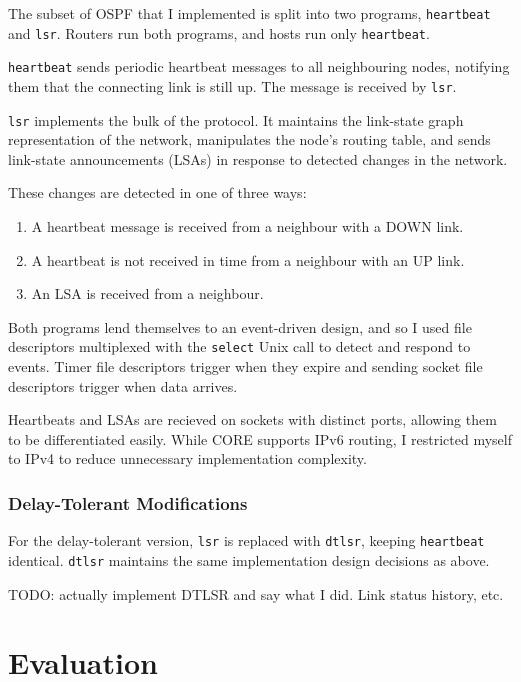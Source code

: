 \documentclass[10pt,twoside,a4paper]{article}
\begin{document}
The subset of OSPF that I implemented is split into two programs, \texttt{heartbeat} and \texttt{lsr}. Routers run both programs, and hosts run only \texttt{heartbeat}.

\texttt{heartbeat} sends periodic heartbeat messages to all neighbouring nodes, notifying them that the connecting link is still up. The message is received by \texttt{lsr}.

\texttt{lsr} implements the bulk of the protocol. It maintains the link-state graph representation of the network, manipulates the node's routing table, and sends link-state announcements (LSAs) in response to detected changes in the network.

These changes are detected in one of three ways:
\begin{enumerate}
	\item
	A heartbeat message is received from a neighbour with a DOWN link.
	
	\item
	A heartbeat is not received in time from a neighbour with an UP link.
	
	\item
	An LSA is received from a neighbour.
\end{enumerate}

Both programs lend themselves to an event-driven design, and so I used file descriptors multiplexed with the \texttt{select} Unix call to detect and respond to events. Timer file descriptors trigger when they expire and sending socket file descriptors trigger when data arrives.

Heartbeats and LSAs are recieved on sockets with distinct ports, allowing them to be differentiated easily. While CORE supports IPv6 routing, I restricted myself to IPv4 to reduce unnecessary implementation complexity.

\subsubsection{Delay-Tolerant Modifications}

For the delay-tolerant version, \texttt{lsr} is replaced with \texttt{dtlsr}, keeping \texttt{heartbeat} identical. \texttt{dtlsr} maintains the same implementation design decisions as above.

TODO: actually implement DTLSR and say what I did. Link status history, etc.



\section{Evaluation}
\end{document}

